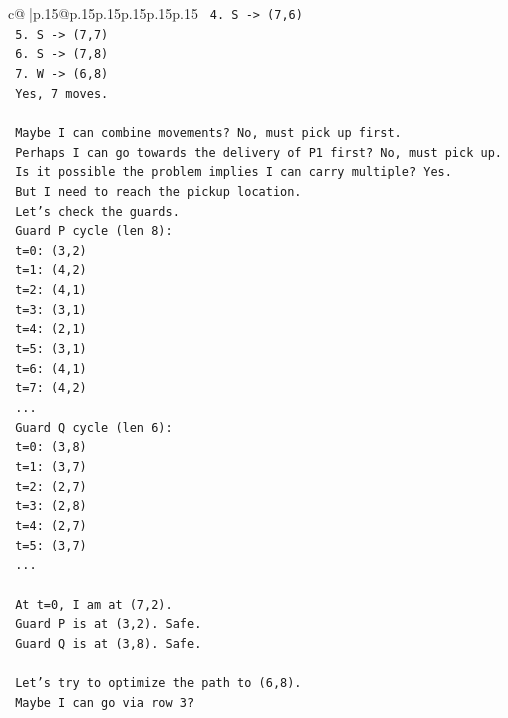 \documentclass{article}
\begin{document}
{\begin{supertabular}{c@{$\;$}|p{.15\linewidth}@{}p{.15\linewidth}p{.15\linewidth}p{.15\linewidth}p{.15\linewidth}p{.15\linewidth}}
{{{\texttt{    4. S {-}> (7,6)} \\
\texttt{    5. S {-}> (7,7)} \\
\texttt{    6. S {-}> (7,8)} \\
\texttt{    7. W {-}> (6,8)} \\
\texttt{    Yes, 7 moves.} \\
\\ 
\texttt{    Maybe I can combine movements? No, must pick up first.} \\
\texttt{    Perhaps I can go towards the delivery of P1 first? No, must pick up.} \\
\texttt{    Is it possible the problem implies I can carry multiple? Yes.} \\
\texttt{    But I need to reach the pickup location.} \\
\texttt{    Let's check the guards.} \\
\texttt{    Guard P cycle (len 8):} \\
\texttt{    t=0: (3,2)} \\
\texttt{    t=1: (4,2)} \\
\texttt{    t=2: (4,1)} \\
\texttt{    t=3: (3,1)} \\
\texttt{    t=4: (2,1)} \\
\texttt{    t=5: (3,1)} \\
\texttt{    t=6: (4,1)} \\
\texttt{    t=7: (4,2)} \\
\texttt{    ...} \\
\texttt{    Guard Q cycle (len 6):} \\
\texttt{    t=0: (3,8)} \\
\texttt{    t=1: (3,7)} \\
\texttt{    t=2: (2,7)} \\
\texttt{    t=3: (2,8)} \\
\texttt{    t=4: (2,7)} \\
\texttt{    t=5: (3,7)} \\
\texttt{    ...} \\
\\ 
\texttt{    At t=0, I am at (7,2).} \\
\texttt{    Guard P is at (3,2). Safe.} \\
\texttt{    Guard Q is at (3,8). Safe.} \\
\\ 
\texttt{    Let's try to optimize the path to (6,8).} \\
\texttt{    Maybe I can go via row 3?} \\
}}}
\end{supertabular}}
\end{document}
